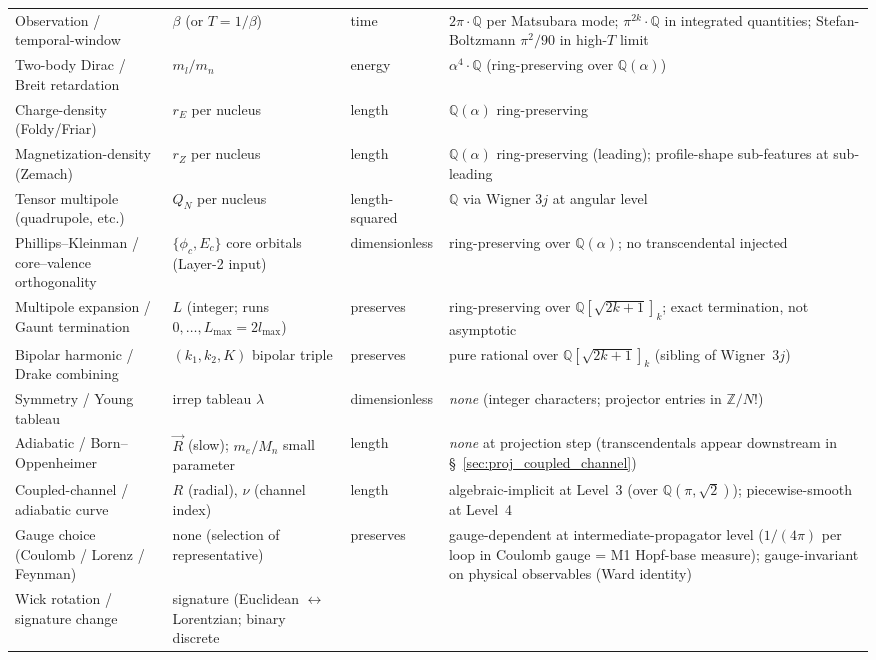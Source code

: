\documentclass[11pt]{article}
\begin{document}
\begin{table}[h]
\begin{tabular}{p{3.5cm} p{3cm} p{2cm} p{4cm}}
Observation / temporal-window & $\beta$ (or $T = 1/\beta$) & time &
$2\pi \cdot \mathbb{Q}$ per Matsubara mode; $\pi^{2k}\cdot\mathbb{Q}$ in
integrated quantities; Stefan-Boltzmann $\pi^2/90$ in high-$T$ limit \\
Two-body Dirac / Breit retardation & $m_l/m_n$ & energy &
$\alpha^4 \cdot \mathbb{Q}$ (ring-preserving over $\mathbb{Q}(\alpha)$) \\
Charge-density (Foldy/Friar) & $r_E$ per nucleus & length &
$\mathbb{Q}(\alpha)$ ring-preserving \\
Magnetization-density (Zemach) & $r_Z$ per nucleus & length &
$\mathbb{Q}(\alpha)$ ring-preserving (leading); profile-shape
sub-features at sub-leading \\
Tensor multipole (quadrupole, etc.) & $Q_N$ per nucleus &
length-squared & $\mathbb{Q}$ via Wigner $3j$ at angular level \\
Phillips--Kleinman / core--valence orthogonality &
$\{\phi_c, E_c\}$ core orbitals (Layer-2 input) & dimensionless &
ring-preserving over $\mathbb{Q}(\alpha)$; no transcendental injected \\
Multipole expansion / Gaunt termination &
$L$ (integer; runs $0,\ldots,L_\text{max} = 2 l_\text{max}$) &
preserves & ring-preserving over $\mathbb{Q}[\sqrt{2k{+}1}]_k$;
exact termination, not asymptotic \\
Bipolar harmonic / Drake combining &
$(k_1, k_2, K)$ bipolar triple & preserves &
pure rational over $\mathbb{Q}[\sqrt{2k{+}1}]_k$ (sibling of Wigner~$3j$) \\
Symmetry / Young tableau &
irrep tableau $\lambda$ & dimensionless &
\textit{none} (integer characters; projector entries in $\mathbb{Z}/N!$) \\
Adiabatic / Born--Oppenheimer &
$\vec{R}$ (slow); $m_e / M_n$ small parameter & length &
\textit{none} at projection step (transcendentals appear downstream
in \S~\ref{sec:proj_coupled_channel}) \\
Coupled-channel / adiabatic curve &
$R$ (radial), $\nu$ (channel index) & length &
algebraic-implicit at Level~3 (over $\mathbb{Q}(\pi,\sqrt{2})$);
piecewise-smooth at Level~4 \\
Gauge choice (Coulomb / Lorenz / Feynman) &
none (selection of representative) & preserves &
gauge-dependent at intermediate-propagator level
($1/(4\pi)$ per loop in Coulomb gauge = M1 Hopf-base measure);
gauge-invariant on physical observables (Ward identity) \\
Wick rotation / signature change &
signature (Euclidean $\leftrightarrow$ Lorentzian; binary discrete

\end{tabular}
\end{table}
\end{document}
